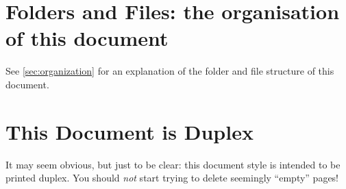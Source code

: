 \section*{Folders and Files: the organisation of this document}
\label{sec:fold-files:-organ}
See \autoref{sec:organization} for an explanation of the folder and file structure of this document.


\section*{This Document is Duplex}
\label{sec:print-this-docum}

It may seem obvious, but just to be clear: this document style is intended to be printed duplex. You should \emph{not} start trying to delete seemingly ``empty'' pages!


